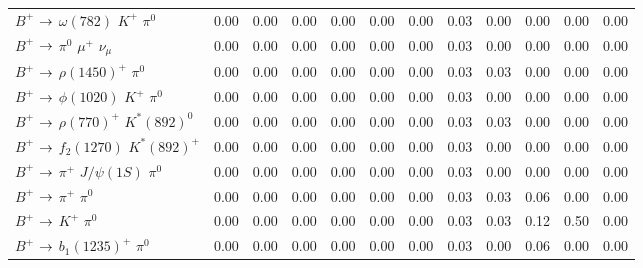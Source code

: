 {\begin{tabular}{lrrrrrrrrrrr}
$B^{+}$ $\rightarrow$ $\omega(782)$ $K^{+}$ $\pi^{0}$                        &         0.00 &         0.00 &         0.00 &         0.00 &         0.00 &         0.00 &         0.03 &         0.00 &         0.00 &         0.00 &         0.00 \\
$B^{+}$ $\rightarrow$ $\pi^{0}$ $\mu^{+}$ $\nu_{\mu}$                        &         0.00 &         0.00 &         0.00 &         0.00 &         0.00 &         0.00 &         0.03 &         0.00 &         0.00 &         0.00 &         0.00 \\
$B^{+}$ $\rightarrow$ $\rho(1450)^{+}$ $\pi^{0}$                             &         0.00 &         0.00 &         0.00 &         0.00 &         0.00 &         0.00 &         0.03 &         0.03 &         0.00 &         0.00 &         0.00 \\
$B^{+}$ $\rightarrow$ $\phi(1020)$ $K^{+}$ $\pi^{0}$                         &         0.00 &         0.00 &         0.00 &         0.00 &         0.00 &         0.00 &         0.03 &         0.00 &         0.00 &         0.00 &         0.00 \\
$B^{+}$ $\rightarrow$ $\rho(770)^{+}$ $K^{*}(892)^{0}$                       &         0.00 &         0.00 &         0.00 &         0.00 &         0.00 &         0.00 &         0.03 &         0.03 &         0.00 &         0.00 &         0.00 \\
$B^{+}$ $\rightarrow$ $f_{2}(1270)$ $K^{*}(892)^{+}$                         &         0.00 &         0.00 &         0.00 &         0.00 &         0.00 &         0.00 &         0.03 &         0.00 &         0.00 &         0.00 &         0.00 \\
$B^{+}$ $\rightarrow$ $\pi^{+}$ $J/\psi(1S)$ $\pi^{0}$                       &         0.00 &         0.00 &         0.00 &         0.00 &         0.00 &         0.00 &         0.03 &         0.00 &         0.00 &         0.00 &         0.00 \\
$B^{+}$ $\rightarrow$ $\pi^{+}$ $\pi^{0}$                                    &         0.00 &         0.00 &         0.00 &         0.00 &         0.00 &         0.00 &         0.03 &         0.03 &         0.06 &         0.00 &         0.00 \\
$B^{+}$ $\rightarrow$ $K^{+}$ $\pi^{0}$                                      &         0.00 &         0.00 &         0.00 &         0.00 &         0.00 &         0.00 &         0.03 &         0.03 &         0.12 &         0.50 &         0.00 \\
$B^{+}$ $\rightarrow$ $b_{1}(1235)^{+}$ $\pi^{0}$                            &         0.00 &         0.00 &         0.00 &         0.00 &         0.00 &         0.00 &         0.03 &         0.00 &         0.06 &         0.00 &         0.00 \\

\end{tabular}}
